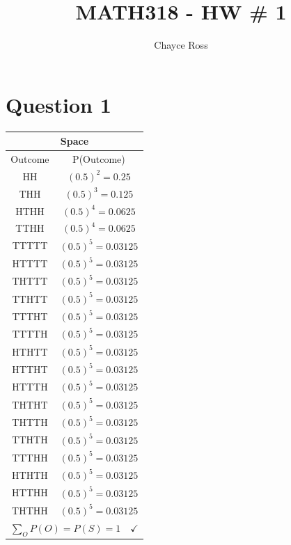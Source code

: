 \documentclass[12pt]{article}
\author{Chayce Ross}
\title{MATH318 - HW \# 1}
\begin{document}
\maketitle
\section*{Question 1}
\begin{tabular}{ |c|c|  }
    \hline
    \multicolumn{2}{|c|}{\textbf{Space} } \\
    \hline
    Outcome& P(Outcome)\\
    \hline

HH & \((0.5)^{2} = 0.25\) \\
THH & \((0.5)^{3} = 0.125\) \\
HTHH & \((0.5)^{4} = 0.0625 \) \\
TTHH & \((0.5)^{4} = 0.0625\) \\
TTTTT & \((0.5)^{5} = 0.03125 \) \\
HTTTT & \((0.5)^{5} = 0.03125\) \\
THTTT & \((0.5)^{5} = 0.03125\) \\
TTHTT & \((0.5)^{5} = 0.03125\) \\
TTTHT & \((0.5)^{5} = 0.03125\) \\ 
TTTTH & \((0.5)^{5} = 0.03125\) \\
HTHTT & \((0.5)^{5} = 0.03125\) \\ 
HTTHT & \((0.5)^{5} = 0.03125\) \\ 
HTTTH & \((0.5)^{5} = 0.03125\) \\ 
THTHT & \((0.5)^{5} = 0.03125\) \\
THTTH & \((0.5)^{5} = 0.03125\) \\
TTHTH & \((0.5)^{5} = 0.03125\) \\
TTTHH & \((0.5)^{5} = 0.03125\) \\
HTHTH & \((0.5)^{5} = 0.03125\) \\
HTTHH & \((0.5)^{5} = 0.03125\) \\ 
THTHH & \((0.5)^{5} = 0.03125\) \\ 
\hline\hline
\multicolumn{2}{|c|}{\(\sum_{O} P(O) = P(S) = 1  \quad \checkmark\)  } \\
\hline
\end{tabular}
\end{document}
